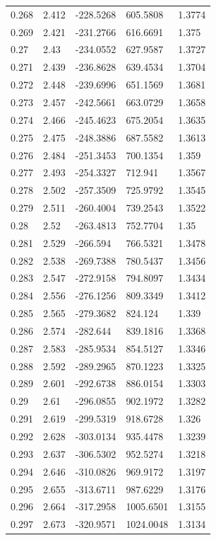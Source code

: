 \begin{tabular}{lllll}
0.268 & 2.412 & -228.5268 & 605.5808 & 1.3774 \\
0.269 & 2.421 & -231.2766 & 616.6691 & 1.375 \\
0.27 & 2.43 & -234.0552 & 627.9587 & 1.3727 \\
0.271 & 2.439 & -236.8628 & 639.4534 & 1.3704 \\
0.272 & 2.448 & -239.6996 & 651.1569 & 1.3681 \\
0.273 & 2.457 & -242.5661 & 663.0729 & 1.3658 \\
0.274 & 2.466 & -245.4623 & 675.2054 & 1.3635 \\
0.275 & 2.475 & -248.3886 & 687.5582 & 1.3613 \\
0.276 & 2.484 & -251.3453 & 700.1354 & 1.359 \\
0.277 & 2.493 & -254.3327 & 712.941 & 1.3567 \\
0.278 & 2.502 & -257.3509 & 725.9792 & 1.3545 \\
0.279 & 2.511 & -260.4004 & 739.2543 & 1.3522 \\
0.28 & 2.52 & -263.4813 & 752.7704 & 1.35 \\
0.281 & 2.529 & -266.594 & 766.5321 & 1.3478 \\
0.282 & 2.538 & -269.7388 & 780.5437 & 1.3456 \\
0.283 & 2.547 & -272.9158 & 794.8097 & 1.3434 \\
0.284 & 2.556 & -276.1256 & 809.3349 & 1.3412 \\
0.285 & 2.565 & -279.3682 & 824.124 & 1.339 \\
0.286 & 2.574 & -282.644 & 839.1816 & 1.3368 \\
0.287 & 2.583 & -285.9534 & 854.5127 & 1.3346 \\
0.288 & 2.592 & -289.2965 & 870.1223 & 1.3325 \\
0.289 & 2.601 & -292.6738 & 886.0154 & 1.3303 \\
0.29 & 2.61 & -296.0855 & 902.1972 & 1.3282 \\
0.291 & 2.619 & -299.5319 & 918.6728 & 1.326 \\
0.292 & 2.628 & -303.0134 & 935.4478 & 1.3239 \\
0.293 & 2.637 & -306.5302 & 952.5274 & 1.3218 \\
0.294 & 2.646 & -310.0826 & 969.9172 & 1.3197 \\
0.295 & 2.655 & -313.6711 & 987.6229 & 1.3176 \\
0.296 & 2.664 & -317.2958 & 1005.6501 & 1.3155 \\
0.297 & 2.673 & -320.9571 & 1024.0048 & 1.3134 \\

\end{tabular}
